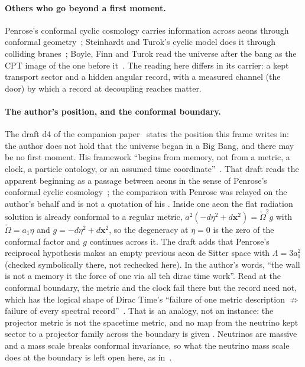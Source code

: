 \paragraph{Others who go beyond a first moment.} Penrose's conformal cyclic cosmology carries information across aeons through conformal geometry~\cite{CCC}; Steinhardt and Turok's cyclic model does it through colliding branes~\cite{ST}; Boyle, Finn and Turok read the universe after the bang as the CPT image of the one before it~\cite{BFT}. The reading here differs in its carrier: a kept transport sector and a hidden angular record, with a measured channel (the door) by which a record at decoupling reaches matter.

\paragraph{The author's position, and the conformal boundary.} The draft d4 of the companion paper~\cite{WallD4} states the position this frame writes in: the author does not hold that the universe began in a Big Bang, and there may be no first moment. His framework ``begins from memory, not from a metric, a clock, a particle ontology, or an assumed time coordinate''~\cite{DT}. That draft reads the apparent beginning as a passage between aeons in the sense of Penrose's conformal cyclic cosmology~\cite{CCC}; the comparison with Penrose was relayed on the author's behalf and is not a quotation of his . Inside one aeon the flat radiation solution is already conformal to a regular metric, $a^2(-d\eta^2+d\mathbf x^2)=\check\Omega^2 g$ with $\check\Omega=a_1\eta$ and $g=-d\eta^2+d\mathbf x^2$, so the degeneracy at $\eta=0$ is the zero of the conformal factor and $g$ continues across it. The draft adds that Penrose's reciprocal hypothesis makes an empty previous aeon de Sitter space with $\Lambda=3a_1^2$ (checked symbolically there, not rechecked here). In the author's words, ``the wall is not a memory it the force of one via all teh dirac time work''. Read at the conformal boundary, the metric and the clock fail there but the record need not, which has the logical shape of Dirac Time's ``failure of one metric description $\not\Rightarrow$ failure of every spectral record''~\cite{DT}. That is an analogy, not an instance: the projector metric is not the spacetime metric, and no map from the neutrino kept sector to a projector family across the boundary is given . Neutrinos are massive and a mass scale breaks conformal invariance, so what the neutrino mass scale does at the boundary is left open here, as in~\cite{WallD4}.
